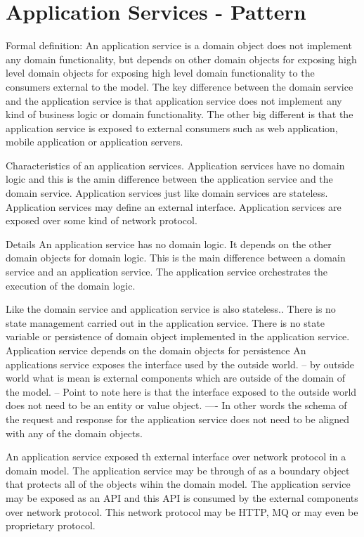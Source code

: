 \section{Application Services - Pattern}
Formal definition:
An application service is a domain object does not implement any domain functionality, but depends on other domain objects for exposing high level domain objects for exposing high level domain functionality to the consumers external to the model.
The key difference between the domain service and the application service is that application service does not implement any kind of business logic or domain functionality.
The other big different is that the application service is exposed to external consumers such as web application, mobile application or application servers.

Characteristics of an application services.
Application services have no domain logic and this is the amin difference between the application service and the domain service.
Application services just like domain services are stateless.
Application services may define an external interface.
Application services are exposed over some kind of network protocol.

Details
An application service has no domain logic. It depends on the other domain objects for domain logic.
This is the main difference between a domain service and an application service.
The application service orchestrates the execution of the domain logic.

Like the domain service and application service is also stateless..
There is no state management carried out in the application service.
There is no state variable or persistence of domain object implemented in the application service.
Application service depends on the domain objects for persistence
An applications service exposes the interface used by the outside world.
-- by outside world what is mean is external components which are outside of the domain of the model.
-- Point to note here is that the interface exposed to the outside world does not need to be an entity or value object.
---- In other words the schema of the request and response for the application service does not need to be aligned  with any of the domain objects.

An application service exposed th external interface over network protocol in a domain model.
The application service may be through of as a boundary object that protects all of the objects wihin the domain model.
The application service may be exposed as an API and this API is consumed by the external components over network protocol.
This network protocol may be HTTP, MQ or may even be proprietary protocol.


